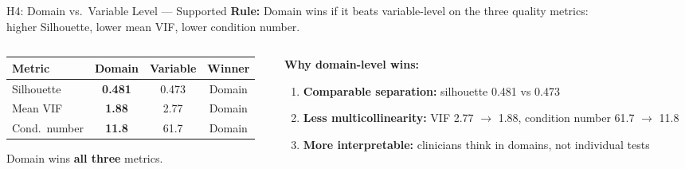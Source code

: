 \documentclass[aspectratio=169, 11pt]{beamer}
\begin{document}
\begin{frame}{H4: Domain vs.\ Variable Level --- \textcolor{green!60!black}{Supported}}
  \small
  \textbf{Rule:} Domain wins if it beats variable-level on the three quality metrics:\\
  \quad higher Silhouette, lower mean VIF, lower condition number.

  \vspace{0.5em}
  \begin{columns}[T]
    \begin{column}{0.5\textwidth}
      \centering
      \begin{tabular}{l c c c}
        \toprule
        \textbf{Metric} & \textbf{Domain} & \textbf{Variable} & \textbf{Winner} \\
        \midrule
        Silhouette   & \textbf{0.481} & 0.473  & Domain   \\
        Mean VIF     & \textbf{1.88}  & 2.77   & Domain   \\
        Cond.\ number & \textbf{11.8}  & 61.7   & Domain   \\
        \bottomrule
      \end{tabular}

      \vspace{0.5em}
      Domain wins \textbf{all three} metrics.
    \end{column}
    \begin{column}{0.5\textwidth}
      \textbf{Why domain-level wins:}
      \begin{enumerate}
        \item \textbf{Comparable separation:} silhouette 0.481 vs 0.473
        \item \textbf{Less multicollinearity:} VIF 2.77 $\to$ 1.88, condition number 61.7 $\to$ 11.8
        \item \textbf{More interpretable:} clinicians think in domains, not individual tests
      \end{enumerate}
    \end{column}
  \end{columns}
\end{frame}
\end{document}
